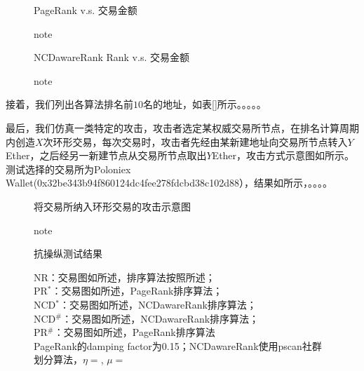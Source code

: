 \begin{figure}
	\centering
	\caption{PageRank v.s. 交易金额}\label{fig:prio}
	\caption*{note}
\end{figure}

\begin{figure}
	\centering
	\caption{NCDawareRank Rank v.s. 交易金额}\label{fig:ncdio}
	\caption*{note}
\end{figure}

接着，我们列出各算法排名前$10$名的地址，如表\ref{}所示。。。。。


最后，我们仿真一类特定的攻击，攻击者选定某权威交易所节点，在排名计算周期内创造$X$次环形交易，每次交易时，攻击者先经由某新建地址向交易所节点转入$Y$Ether，之后经另一新建节点从交易所节点取出$Y$Ether，攻击方式示意图如所示。测试选择的交易所为Poloniex Wallet(0x32be343b94f860124dc4fee278fdcbd38c102d88），结果如所示，。。。。

\begin{figure}
	\centering
	\caption{将交易所纳入环形交易的攻击示意图}\label{fig:loop}
	\caption*{note}
\end{figure}

\begin{figure}
	\centering
	\caption{抗操纵测试结果}\label{fig:antiManipulation}
	\caption*{\footnotesize{NR：交易图如所述，排序算法按照所述；\\PR$^*$：交易图如所述，PageRank排序算法；\\ NCD$^*$：交易图如所述，NCDawareRank排序算法；\\ NCD$^{\#}$：交易图如\cite{nem}所述，NCDawareRank排序算法；\\ PR$^{\#}$：交易图如\cite{nem}所述，PageRank排序算法 \\ PageRank的damping factor为0.15；NCDawareRank使用pscan\cite{}社群划分算法，$\eta=$, $\mu=$}}
\end{figure}

